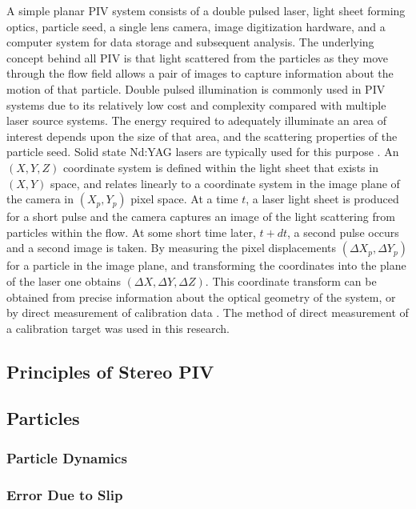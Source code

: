 A simple planar PIV system consists of a double pulsed laser, light sheet 
forming optics, particle seed, a single lens camera, image digitization 
hardware, and a computer system for data storage and subsequent analysis. The 
underlying concept behind all PIV is that light scattered from the particles as 
they move through the flow field allows a pair of images to capture information 
about the motion of that particle. Double pulsed illumination is commonly used 
in PIV systems due to its relatively low cost and complexity compared with 
multiple laser source systems. The energy required to adequately illuminate an 
area of interest depends upon the size of that area, and the scattering 
properties of the particle seed. Solid state Nd:YAG lasers are typically used 
for this purpose \cite{adrian2011}. An $(X, Y, Z)$ coordinate system is defined 
within the light sheet that exists in $(X, Y)$ space, and relates linearly to a 
coordinate system in the image plane of the camera in $(X_p, Y_p)$ pixel space. 
At a time $t$, a laser light sheet is produced for a short pulse and the camera 
captures an image of the light scattering from particles within the flow. At 
some short time later, $t + dt$, a second pulse occurs and a second image is 
taken. By measuring the pixel displacements $(\Delta X_p, \Delta Y_p)$ for a 
particle in the image plane, and transforming the coordinates into the plane of 
the laser one obtains $(\Delta X, \Delta Y, \Delta Z)$. This coordinate 
transform can be obtained from precise information about the optical geometry 
of the system, or by direct measurement of calibration data \cite{fouras2007}.
The method of direct measurement of a calibration target was used in this 
research. 

\subsection{Principles of Stereo PIV}

\subsection{Particles}

\subsubsection{Particle Dynamics} 

\subsubsection{Error Due to Slip}

